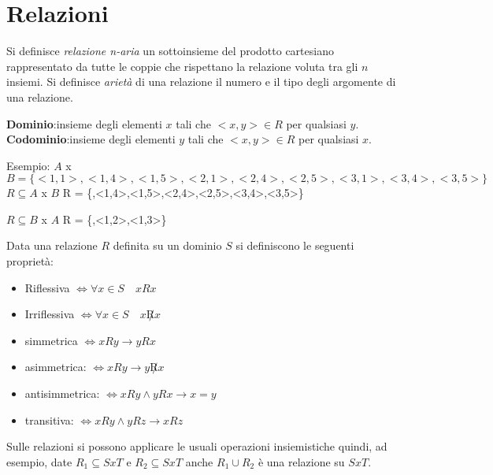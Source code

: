 \chapter{Relazioni}
Si definisce \textit{relazione n-aria} un sottoinsieme del prodotto cartesiano
rappresentato da tutte le coppie che rispettano la relazione voluta tra gli $n$ insiemi.
Si definisce \textit{arietà} di una relazione il numero e il tipo degli argomente
di una relazione.

\textbf{Dominio}:insieme degli elementi $x$ tali che $<x,y> \in R$ per qualsiasi $y$.
\textbf{Codominio}:insieme degli elementi $y$ tali che $<x,y> \in R$ per qualsiasi $x$.

Esempio:\newline
$A$ x $B = \{<1,1>,<1,4>,<1,5>,<2,1>,<2,4>,<2,5>,<3,1>,<3,4>,<3,5>\} $ \newline
$R \subseteq A$ x $B$\newline
R = \{<1,1>,<1,4>,<1,5>,<2,4>,<2,5>,<3,4>,<3,5>\}

$R \subseteq B$ x $A$ \newline
R = \{<1,1>,<1,2>,<1,3>\}

Data una relazione $R$ definita su un dominio $S$ si definiscono le seguenti proprietà:

\begin{itemize}
  \item Riflessiva $\iff \forall x \in S \quad xRx$
  \item Irriflessiva $\iff \forall x \in S \quad x \not R x$
  \item simmetrica $\iff  xRy \rightarrow yRx$
  \item asimmetrica: $\iff xRy \rightarrow y \not R x$
  \item antisimmetrica: $\iff xRy \land yRx \rightarrow x = y$
  \item transitiva: $\iff xRy \land yRz \rightarrow xRz$
\end{itemize}


Sulle relazioni si possono applicare le usuali operazioni insiemistiche quindi, ad esempio,
date $R_1 \subseteq S x T$ e $R_2 \subseteq S x T$ anche $R_1 \cup R_2$ è una relazione su $S x T$.





